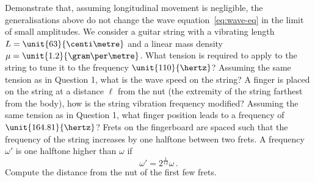 \begin{ExerciseList}
  \Question Demonstrate that, assuming longitudinal movement is negligible, the
  generalisations above do not change the wave equation~\cref{eq:wave-eq} in the limit of
  small amplitudes.
  \Exercise[label=guitar] We consider a guitar string with a vibrating length
  $L=\unit{63}{\centi\metre}$ and a linear mass density $\mu=\unit{1.2}{\gram\per\metre}$.
  \Question What tension is required to apply to the string to tune it to the frequency
  $\unit{110}{\hertz}$? \Question Assuming the same tension as in Question 1, what is the
  wave speed on the string? \Question A finger is placed on the string at a distance
  $\ell$ from the nut (the extremity of the string farthest from the body), how is the
  string vibration frequency modified? \Question Assuming the same tension as in Question
  1, what finger position leads to a frequency of $\unit{164.81}{\hertz}$? \Question Frets
  on the fingerboard are spaced such that the frequency of the string increases by one
  halftone between two frets. A frequency $\omega'$ is one halftone higher than $\omega$
  if
  \begin{equation}
    \omega'=2^{\frac{1}{12}}\omega\,.
  \end{equation}
  Compute the distance from the nut of the first few frets.
\end{ExerciseList}
